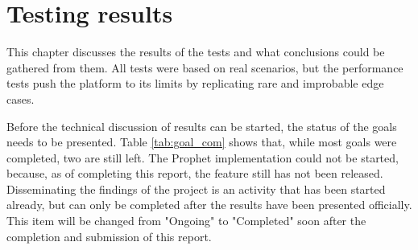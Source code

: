 \chapter{Testing results}\label{chap:conclusion}
This chapter discusses the results of the tests and what conclusions could be gathered from them. All tests were based on real scenarios, but the performance tests push the platform to its limits by replicating rare and improbable edge cases.

Before the technical discussion of results can be started, the status of the goals needs to be presented. Table \ref{tab:goal_com} shows that, while most goals were completed, two are still left. The Prophet implementation could not be started, because, as of completing this report, the feature still has not been released. Disseminating the findings of the project is an activity that has been started already, but can only be completed after the results have been presented officially. This item will be changed from "Ongoing" to "Completed" soon after the completion and submission of this report.

